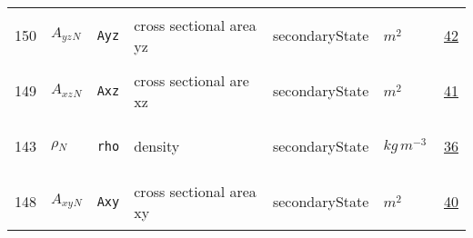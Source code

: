 \begin{longtable}{|p{1cm}|p{2.5cm}|p{4.5cm}|p{8cm}|p{3.0cm}|p{3cm}|p{1cm}|}
            150
             & \hypertarget{"v:150"}{ $ {{A_{yz}}}{_{N}} $}
             & \verb|Ayz|
             & cross sectional area yz
             & \begin{lay}secondaryState \end{lay}
             & $ m^{2} \, $
             &                 \hyperlink{"e:42"}{ 42 }
                 \\
            149
             & \hypertarget{"v:149"}{ $ {{A_{xz}}}{_{N}} $}
             & \verb|Axz|
             & cross sectional are xz
             & \begin{lay}secondaryState \end{lay}
             & $ m^{2} \, $
             &                 \hyperlink{"e:41"}{ 41 }
                 \\
            143
             & \hypertarget{"v:143"}{ $ {{\rho}}{_{N}} $}
             & \verb|rho|
             & density
             & \begin{lay}secondaryState \end{lay}
             & $ kg \,m^{-3} \, $
             &                 \hyperlink{"e:36"}{ 36 }
                 \\
            148
             & \hypertarget{"v:148"}{ $ {{A_{xy}}}{_{N}} $}
             & \verb|Axy|
             & cross sectional area xy
             & \begin{lay}secondaryState \end{lay}
             & $ m^{2} \, $
             &                 \hyperlink{"e:40"}{ 40 }
                 \\
    \end{longtable}